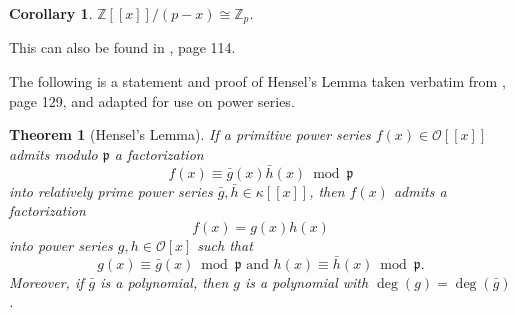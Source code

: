 \documentclass{article}
\newtheorem{theorem}{Theorem}
\newtheorem{corollary}{Corollary}
\begin{document}
\begin{corollary}\label{zp}
$\mathbb{Z}[[x]]/(p-x) \cong \mathbb{Z}_p$.
\end{corollary}

This can also be found in \cite{MR1697859}, page 114.

The following is a statement and proof of Hensel's Lemma taken verbatim from \cite{MR1697859}, page 129, and adapted for use on power series.

\begin{theorem}[Hensel's Lemma]\label{hensel}
If a primitive power series $f(x) \in \mathcal{O}[[x]]$ admits modulo $\mathfrak{p}$ a factorization
$$f(x) \equiv \bar{g}(x)\bar{h}(x) \bmod{\mathfrak{p}}$$
into relatively prime power series $\bar{g},\bar{h} \in \kappa[[x]]$, then $f(x)$ admits a factorization
$$f(x) = g(x)h(x)$$
into power series $g,h \in \mathcal{O}[x]$ such that $$g(x) \equiv \bar{g}(x) \bmod{\mathfrak{p}} \mbox{ and } h(x) \equiv \bar{h}(x) \bmod{\mathfrak{p}}.$$
Moreover, if $\bar{g}$ is a polynomial, then $g$ is a polynomial with $\deg(g) = \deg(\bar{g})$.
\end{theorem}
\end{document}

